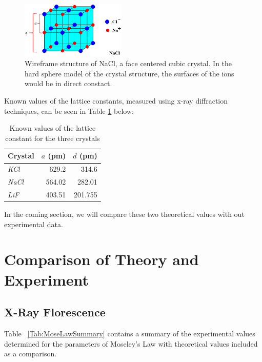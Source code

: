 \documentclass[%
 reprint,
 amsmath,amssymb,
 aps,
 pra,
]{revtex4-1}
\begin{document}
\begin{figure}[H]
	\centering
	\includegraphics[width=5cm]{nacl_lattice.png}
	\caption{Wireframe structure of NaCl, a face centered cubic crystal. In the hard sphere model of the crystal structure, the surfaces of the ions would be in direct constact.}
	\label{fig:lattice_nacl}
\end{figure}

Known values\cite{lattice, lattice2, lattice3} of the lattice constants, measured using x-ray diffraction techniques, can be seen in Table \ref{table:known_d} below:

\begin{table}[htbp]
	\begin{center}
	\begin{tabular}{|l|r|r|}
		\hline
		\textbf{Crystal} & \multicolumn{1}{l|}{\textbf{$a$ (pm)}} & \multicolumn{1}{l|}{\textbf{$d$ (pm)}} \\ \hline
		\textit{KCl} & 629.2 & 314.6 \\ \hline
		\textit{NaCl} & 564.02 & 282.01 \\ \hline
		\textit{LiF} & 403.51 & 201.755 \\ \hline
	\end{tabular}
	\end{center}
	\caption{Known values of the lattice constant for the three crystals}
	\label{table:known_d}
\end{table}

In the coming section, we will compare these two theoretical values with out experimental data.


\section{Comparison of Theory and Experiment}

\subsection{X-Ray Florescence}

Table ~\ref{Tab:MoseLawSummary} contains a summary of the experimental values determined for the parameters of Moseley's Law with theoretical values included as a comparison.
\end{document}
